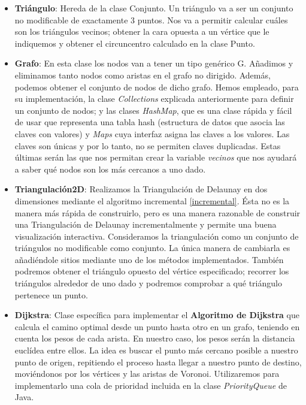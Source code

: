 \begin{itemize}
    \item \textbf{Triángulo}: Hereda de la clase Conjunto. Un triángulo va a ser un conjunto no modificable de exactamente 3 puntos. Nos va a permitir calcular cuáles son los triángulos vecinos; obtener la cara opuesta a un vértice que le indiquemos y obtener el circuncentro calculado en la clase Punto. 
    \item \textbf{Grafo}: En esta clase los nodos van a tener un tipo genérico G. Añadimos y eliminamos tanto nodos como aristas en el grafo no dirigido. Además, podemos obtener el conjunto de nodos de dicho grafo. Hemos empleado, para su implementación, la clase \textit{Collections} explicada anteriormente para definir un conjunto de nodos; y las clases \textit{HashMap}, que es una clase rápida y fácil de usar que representa una tabla hash (estructura de datos que asocia las claves con valores) y \textit{Maps} cuya interfaz asigna las claves a los valores. Las claves son únicas y por lo tanto, no se permiten claves duplicadas. Estas últimas serán las que nos permitan crear la variable \textit{vecinos} que nos ayudará a saber qué nodos son los más cercanos a uno dado.
    \item \textbf{Triangulación2D}: Realizamos la Triangulación de Delaunay en dos dimensiones mediante el algoritmo incremental \ref{incremental}. Ésta no es la manera más rápida de construirlo, pero es una manera razonable de construir una Triangulación de Delaunay incrementalmente y permite una buena visualización interactiva. Consideramos la triangulación como un conjunto de triángulos no modificable como conjunto. La única manera de cambiarla es añadiéndole sitios mediante uno de los métodos implementados. También podremos obtener el triángulo opuesto del vértice especificado; recorrer los triángulos alrededor de uno dado y podremos comprobar a qué triángulo pertenece un punto. 
    \item \textbf{Dijkstra}: Clase específica para implementar el \textbf{Algoritmo de Dijkstra} que calcula el camino optimal desde un punto hasta otro en un grafo, teniendo en cuenta los pesos de cada arista. En nuestro caso, los pesos serán la distancia euclídea entre ellos. La idea es buscar el punto más cercano posible a nuestro punto de origen, repitiendo el proceso hasta llegar a nuestro punto de destino, moviéndonos por los vértices y las aristas de Voronoi. Utilizaremos para implementarlo una cola de prioridad incluida en la clase \textit{PriorityQueue} de Java.
\end{itemize}
\vspace{0.3cm} 

